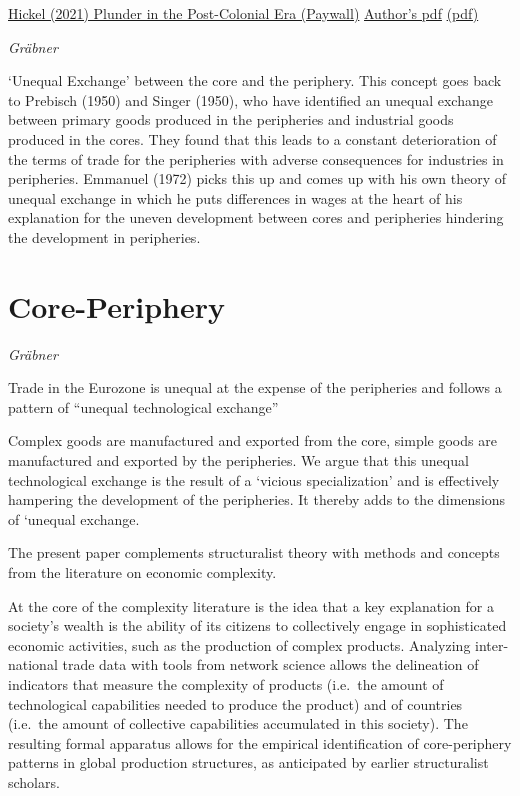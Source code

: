 \documentclass[
]{book}
\begin{document}
\href{https://doi.org/10.1080/13563467.2021.1899153}{Hickel (2021) Plunder in the Post-Colonial Era (Paywall)}
\href{https://t.co/1WGPwjTWuB?amp=1}{Author's pdf}
\href{pdf/Hickel_2021_Plunder.pdf}{(pdf)}

\emph{Gräbner}

`Unequal Exchange' between the core and the
periphery. This concept goes back to Prebisch (1950) and
Singer (1950), who have identified an unequal exchange
between primary goods produced in the peripheries and
industrial goods produced in the cores. They found that this
leads to a constant deterioration of the terms of trade for
the peripheries with adverse consequences for industries
in peripheries. Emmanuel (1972) picks this up and comes
up with his own theory of unequal exchange in which he
puts differences in wages at the heart of his explanation
for the uneven development between cores and peripheries
hindering the development in peripheries.

\hypertarget{core-periphery}{%
\section{Core-Periphery}\label{core-periphery}}

\emph{Gräbner}

Trade in the Eurozone is unequal at the expense of the peripheries
and follows a pattern of ``unequal technological exchange''

Complex goods are manufactured and exported from the core, simple goods are manufactured and exported by the peripheries. We argue that this unequal technological exchange is the result of a `vicious specialization' and is effectively hampering the development of the peripheries. It thereby adds to the dimensions of `unequal exchange.

The present paper complements structuralist theory with
methods and concepts from the literature on economic complexity.

At the core of the complexity literature is the idea that a key
explanation for a society's wealth is the ability of its citizens
to collectively engage in sophisticated economic activities,
such as the production of complex products. Analyzing inter-
national trade data with tools from network science allows the delineation of indicators
that measure the complexity of products (i.e.~the amount
of technological capabilities needed to produce the product)
and of countries (i.e.~the amount of collective capabilities
accumulated in this society). The resulting formal apparatus allows
for the empirical identification of core-periphery
patterns in global production structures, as anticipated by
earlier structuralist scholars.
\end{document}
